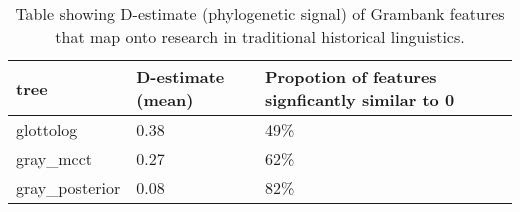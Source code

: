 \begin{table}[ht]
\centering
\begin{tabular}{lll}
  \hline
tree & D-estimate (mean) & Propotion of features signficantly similar to 0 \\ 
  \hline
glottolog & 0.38 & 49\% \\ 
  gray\_mcct & 0.27 & 62\% \\ 
  gray\_posterior & 0.08 & 82\% \\ 
   \hline
\end{tabular}
\caption{Table showing D-estimate (phylogenetic signal) of Grambank features that map onto research in traditional historical linguistics.} 
\label{d_estimate_summary}
\end{table}
